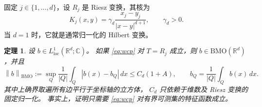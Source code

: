 \documentclass[UTF8,fontset=fandol,a4paper,11pt]{ctexart}
\newtheorem{theorem}{定理}
\newcommand{\R}{\mathbb R}
\newcommand{\BMO}{\mathrm{BMO}}
\newcommand{\norm}[1]{\left\lVert#1\right\rVert}
\begin{document}
固定 $j\in\{1,\ldots,d\}$，设 $R_j$ 是 Riesz 变换，其核为
\[
 K_j(x,y)=\gamma_d\frac{x_j-y_j}{|x-y|^{d+1}},
 \qquad \gamma_d>0.
\]
当 $d=1$ 时，它就是通常归一化的 Hilbert 变换。

\begin{theorem}\label{thm:converse}
设 $b\in L^1_{\mathrm{loc}}(\R^d;\mathbb C)$。
如果 \eqref{eq:wcp} 对 $T=R_j$ 成立，则
$b\in\BMO(\R^d)$，并且
\begin{equation}\label{eq:bmo-bound}
 \norm{b}_{\BMO}
 :=\sup_Q\frac1{|Q|}\int_Q|b(x)-b_Q|\,dx
 \le C_d(1+A),
 \qquad b_Q=\frac1{|Q|}\int_Q b(x)\,dx.
\end{equation}
其中上确界取遍所有边平行于坐标轴的立方体，
$C_d$ 只依赖于维数及 Riesz 变换的固定归一化。
事实上，证明只需要 \eqref{eq:wcp} 对有界可测集的特征函数成立。
\end{theorem}
\end{document}
